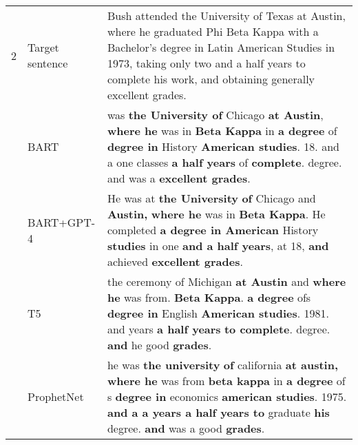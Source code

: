 \documentclass[journal]{IEEEtran}
\begin{document}
\begin{table*}[!htbp]
\begin{tabular}{|p{}|p{}|p{}|}
		2            & Target sentence & Bush attended the University of Texas at Austin, where he graduated Phi Beta Kappa with a Bachelor's degree in Latin American Studies in 1973, taking only two and a half years to complete his work, and obtaining generally excellent grades.                                                                                \\ \cline{2-3}
		             & BART            & was \textbf{the University of} Chicago \textbf{at Austin}, \textbf{where he} was in \textbf{Beta Kappa} in \textbf{a degree} of \textbf{degree in} History \textbf{American studies}. 18. and a one classes \textbf{a half years} of \textbf{complete}. degree. and was a \textbf{excellent grades}.                           \\ \cline{2-3}
		             & BART+GPT-4      & He was at \textbf{the University} \textbf{of} Chicago and \textbf{Austin,} \textbf{where he} was in \textbf{Beta Kappa}. He completed \textbf{a degree in American} History \textbf{studies} in one \textbf{and a half years}, at 18, \textbf{and} achieved \textbf{excellent grades}.                                         \\ \cline{2-3}
		             & T5              & the ceremony of Michigan \textbf{at Austin} and \textbf{where he} was from. \textbf{Beta Kappa}. \textbf{a degree} ofs \textbf{degree in} English \textbf{American studies}. 1981. and years \textbf{a half years} \textbf{to complete}. degree. \textbf{and} he good \textbf{grades}.                                         \\ \cline{2-3}
		             & ProphetNet      & he was \textbf{the university} \textbf{of} california \textbf{at austin,} \textbf{where he} was from \textbf{beta kappa} in \textbf{a degree} of s \textbf{degree in} economics \textbf{american studies}. 1975. \textbf{and a a years a half years to} graduate \textbf{his} degree. \textbf{and} was a good \textbf{grades}. \\ \hline
		

\end{tabular}
\end{table*}
\end{document}
